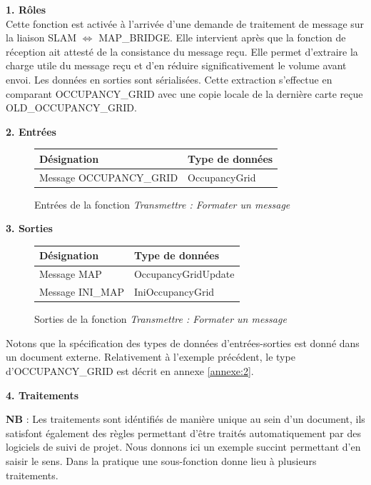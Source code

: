   \textbf{1. Rôles } \\
  Cette fonction est activée à l’arrivée d’une demande de traitement de message sur la liaison SLAM $\Longleftrightarrow{}$ MAP\_BRIDGE.
  Elle intervient après que la fonction de réception ait attesté de la consistance du message reçu.
  Elle permet d’extraire la charge utile du message reçu et d’en réduire significativement le volume avant envoi.  Les données en sorties sont sérialisées.
  Cette extraction s’effectue en comparant OCCUPANCY\_GRID avec une copie locale de la dernière carte reçue OLD\_OCCUPANCY\_GRID.
  
  \textbf{2. Entrées }
  \begin{figure}[!h]
    \begin{center}
      \begin{tabular}{|l|l|}
	\hline
	\textbf{Désignation} & \textbf{Type de données} \\
	\hline
	Message OCCUPANCY\_GRID & OccupancyGrid \\
	\hline
      \end{tabular}
    \end{center}
    \caption{Entrées de la fonction \emph{Transmettre : Formater un message}}
  \end{figure}
  
  \textbf{3. Sorties }
  \begin{figure}[!h]
    \begin{center}
      \begin{tabular}{|l|l|}
	\hline
	\textbf{Désignation} & \textbf{Type de données} \\
	\hline
	Message MAP & OccupancyGridUpdate \\
	Message INI\_MAP & IniOccupancyGrid \\
	\hline
      \end{tabular}
    \end{center}
    \caption{Sorties de la fonction \emph{Transmettre : Formater un message}}
  \end{figure}
  
  Notons que la spécification des types de données d'entrées-sorties est donné dans un document externe. 
  Relativement à l'exemple précédent, le type d'OCCUPANCY\_GRID est décrit en annexe \ref{annexe:2}.  
  
  \textbf{4. Traitements }
  
  \textbf{NB} : Les traitements sont idéntifiés de manière unique au sein d'un document, ils satisfont également des règles permettant d'être traités automatiquement par des logiciels de suivi de projet. 
  Nous donnons ici un exemple succint permettant d'en saisir le sens. Dans la pratique une sous-fonction donne lieu à plusieurs traitements.
  
